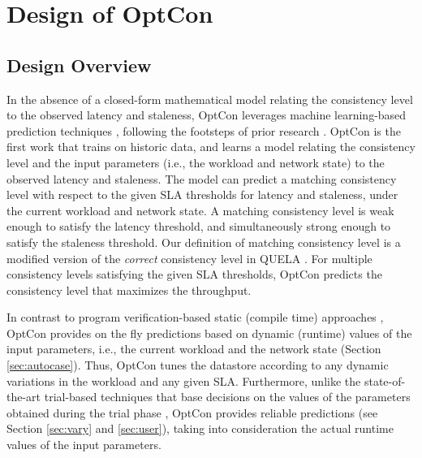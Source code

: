\documentclass[conference]{IEEEtran}
\begin{document}
\section{Design of OptCon}\label{sec:design}
\subsection{Design Overview}\label{sec:designover}
   In the absence of a closed-form mathematical model relating the consistency level to the observed latency and staleness, OptCon leverages machine learning-based prediction techniques \cite{Flach:2012:MLA:2490546}, following the footsteps of prior research  \cite{lacurts2014cicada,Winstein:2013:TEM:2486001.2486020,Ravindranath:2013:TCU:2517349.2522717}. OptCon is the first work that trains on historic data, and learns a model \emph{} relating the consistency level and the input parameters (i.e., the workload and network state) to the observed latency and staleness. The model  can predict a matching consistency level with respect to the given SLA thresholds for latency and staleness, under the current workload and network
   state. A matching consistency level is weak enough to satisfy the latency threshold, and simultaneously strong enough to satisfy the staleness threshold.
     Our definition of matching consistency level is a modified version of the \emph{correct} consistency level in QUELA \cite{Sivaramakrishnan:2015:DPO:2813885.2737981}. For  multiple consistency levels satisfying the given SLA thresholds, OptCon predicts the consistency level that maximizes the throughput.
      \par In contrast to program verification-based static (compile time) approaches \cite{Sivaramakrishnan:2015:DPO:2813885.2737981},
      OptCon provides on the fly predictions based on dynamic (runtime) values of the input parameters, i.e., the current workload and the network state (Section \ref{sec:autocase}).
       Thus, OptCon tunes the datastore according to any dynamic variations in the workload and any given SLA.
       Furthermore, unlike the
      state-of-the-art trial-based techniques that base decisions on the values of the parameters obtained during the trial phase \cite{Terry:2013:CSL:2517349.2522731, Ardekani:2014:SGC:2685048.2685077},
      OptCon provides reliable predictions (see Section \ref{sec:vary} and \ref{sec:user}), taking into consideration the actual runtime values of the input parameters.
  \begin{table}[!htb]
\centering
\captionsetup{justification=centering}
\caption{Example subSLAs}\label{table:sla}
\end{table}
\end{document}
